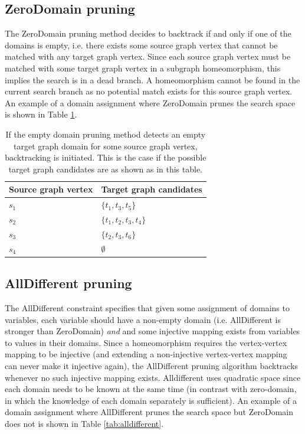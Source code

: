 \subsection{ZeroDomain pruning}
The ZeroDomain pruning method decides to backtrack if and only if one of the domains is empty, i.e. there exists some source graph vertex that cannot be matched with any target graph vertex. Since each source graph vertex must be matched with some target graph vertex in a subgraph homeomorphism, this implies the search is in a dead branch. A homeomorphism cannot be found in the current search branch as no potential match exists for this source graph vertex. An example of a domain assignment where ZeroDomain prunes the search space is shown in Table \ref{tab:zerodomain}.

\label{sec:emptyDomain}
\begin{table}
\centering
\begin{tabular}{|l|l|}
\hline
\textbf{Source graph vertex} & \textbf{Target graph candidates} \\ \hline
$s_1$                          & $\{t_1, t_3, t_5\}$         \\ \hline
$s_2$                          & $\{t_1, t_2, t_3, t_4\}$       \\ \hline
$s_3$                          & $\{t_2, t_3, t_6\}$      \\ \hline
$s_4$                          & $\emptyset$                      \\ \hline
\end{tabular}
\caption{If the empty domain pruning method detects an empty target graph domain for some source graph vertex, backtracking is initiated. This is the case if the possible target graph candidates are as shown as in this table.}
\label{tab:zerodomain}
\end{table}

\subsection{AllDifferent pruning}
\label{sec:alldifferent}
The AllDifferent constraint specifies that given some assignment of domains to variables, each variable should have a non-empty domain (i.e. AllDifferent is stronger than ZeroDomain) \textit{and} and some injective mapping exists from variables to values in their domains. Since a homeomorphism requires the vertex-vertex mapping to be injective (and extending a non-injective vertex-vertex mapping can never make it injective again), the AllDifferent pruning algorithm backtracks whenever no such injective mapping exists. Alldifferent uses quadratic space since each domain needs to be known at the same time (in contrast with zero-domain, in which the knowledge of each domain separately is sufficient). An example of a domain assignment where AllDifferent prunes the search space but ZeroDomain does not is shown in Table \ref{tab:alldifferent}. 

